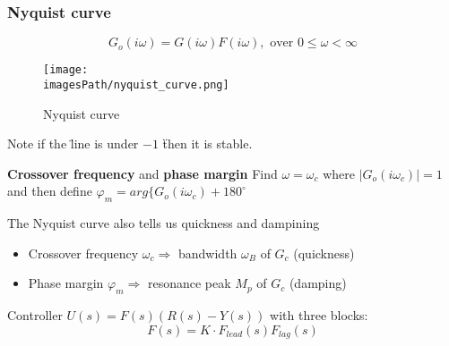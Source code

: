 \subsubsection{Nyquist curve}
\begin{equation*}
    G_o(i\omega) = G(i\omega)F(i\omega), \text{ over } 0 \leq \omega < \infty
\end{equation*}


\begin{figure}[!h]
    \centering
    \texttt{[image: \\imagesPath/nyquist\_curve.png]}
    \caption{Nyquist curve}
    \label{fig:nyquist_curve}
\end{figure}
Note if the \" line is under $-1$ \" then it is stable.
\begin{definitionblock}{\textbf{Crossover frequency} and \textbf{phase margin}}
   Find $\omega = \omega_c$ where $|G_o(i\omega_c)| = 1$ and then define \newline
   $\varphi_m = arg\{ G_o(i\omega_c) + 180^{\circ}$
\end{definitionblock}

The Nyquist curve also tells us quickness and dampining
\begin{itemize}
    \item Crossover frequency $\omega_c \Rightarrow$ bandwidth $\omega_B$ of $G_c$ (quickness)
    \item Phase margin $\varphi_m \Rightarrow$ resonance peak $M_p$ of $G_c$ (damping)
\end{itemize}

Controller $U(s) = F(s)(R(s)-Y(s))$ with three blocks:
\begin{equation*}
    F(s) = K\cdot F_{lead}(s) F_{lag}(s)
\end{equation*}


